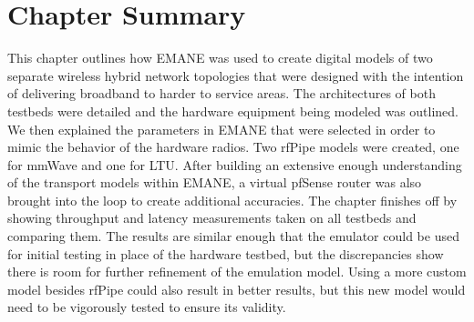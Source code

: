 \section{Chapter Summary}
This chapter outlines how EMANE was used to create digital models of two separate wireless hybrid network topologies that were designed with the intention of delivering broadband to harder to service areas.
The architectures of both testbeds were detailed and the hardware equipment being modeled was outlined.
We then explained the parameters in EMANE that were selected in order to mimic the behavior of the hardware radios. Two rfPipe models were created, one for mmWave and one for LTU.
After building an extensive enough understanding of the transport models within EMANE, a virtual pfSense router was also brought into the loop to create additional accuracies.
The chapter finishes off by showing throughput and latency measurements taken on all testbeds and comparing them.
The results are similar enough that the emulator could be used for initial testing in place of the hardware testbed, but the discrepancies show there is room for further refinement of the emulation model.
Using a more custom model besides rfPipe could also result in better results, but this new model would need to be vigorously tested to ensure its validity.